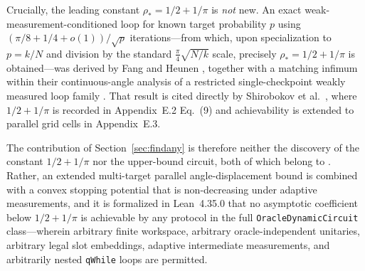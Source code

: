 \documentclass[11pt,a4paper]{article}
\theoremstyle{definition}
\theoremstyle{remark}
\begin{document}
Crucially, the leading constant \(\rho_* = 1/2 + 1/\pi\) is \emph{not} new. An exact weak-measurement-conditioned loop for known target probability \(p\) using \((\pi/8 + 1/4 + o(1))/\sqrt{p}\) iterations---from which, upon specialization to \(p = k/N\) and division by the standard \(\frac{\pi}{4}\sqrt{N/k}\) scale, precisely \(\rho_* = 1/2 + 1/\pi\) is obtained---was derived by Fang and Heunen \cite{fang2026}, together with a matching infimum within their continuous-angle analysis of a restricted single-checkpoint weakly measured loop family \cite{fang2026}. That result is cited directly by Shirobokov et al.\ \cite{shirobokov2026}, where \(1/2 + 1/\pi\) is recorded in Appendix~E.2 Eq.~(9) and achievability is extended to parallel grid cells in Appendix~E.3.

The contribution of Section~\ref{sec:findany} is therefore neither the discovery of the constant \(1/2 + 1/\pi\) nor the upper-bound circuit, both of which belong to \cite{fang2026,shirobokov2026}. Rather, an extended multi-target parallel angle-displacement bound is combined with a convex stopping potential that is non-decreasing under adaptive measurements, and it is formalized in Lean~4.35.0 that no asymptotic coefficient below \(1/2 + 1/\pi\) is achievable by any protocol in the full \texttt{OracleDynamic\allowbreak Circuit} class---wherein arbitrary finite workspace, arbitrary oracle-independent unitaries, arbitrary legal slot embeddings, adaptive intermediate measurements, and arbitrarily nested \texttt{qWhile} loops are permitted.
\end{document}
